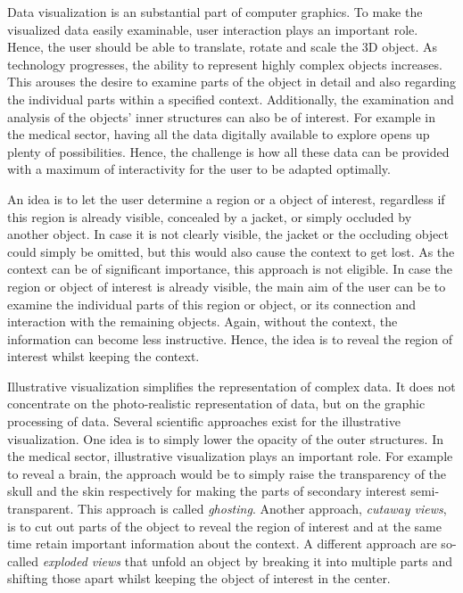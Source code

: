 

Data visualization is an substantial part of computer graphics. To make the visualized data easily examinable, user interaction plays an important role. Hence, the user should be able to translate, rotate and scale the 3D object. As technology progresses, the ability to represent highly complex objects increases. This arouses the desire to examine parts of the object in detail and also regarding the individual parts within a specified context. Additionally, the examination and analysis of the objects' inner structures can also be of interest. For example in the medical sector, having all the data digitally available to explore opens up plenty of possibilities. Hence, the challenge is how all these data can be provided with a maximum of interactivity for the user to be adapted optimally.

An idea is to let the user determine a region or a object of interest, regardless if this region is already visible, concealed by a jacket, or simply occluded by another object. In case it is not clearly visible, the jacket or the occluding object could simply be omitted, but this would also cause the context to get lost. As the context can be of significant importance, this approach is not eligible. In case the region or object of interest is already visible, the main aim of the user can be to examine the individual parts of this region or object, or its connection and interaction with the remaining objects. Again, without the context, the information can become less instructive. Hence, the idea is to reveal the region of interest whilst keeping the context.

Illustrative visualization simplifies the representation of complex data. It does not concentrate on the photo-realistic representation of data, but on the graphic processing of data. Several scientific approaches exist for the illustrative visualization. One idea is to simply lower the opacity of the outer structures. In the medical sector, illustrative visualization plays an important role. For example to reveal a brain, the approach would be to simply raise the transparency of the skull and the skin respectively for making the parts of secondary interest semi-transparent. This approach is called \emph{ghosting}. Another approach, \emph{cutaway views}, is to cut out parts of the object to reveal the region of interest and at the same time retain important information about the context. A different approach are so-called \emph{exploded views} that unfold an object by breaking it into multiple parts and shifting those apart whilst keeping the object of interest in the center.

